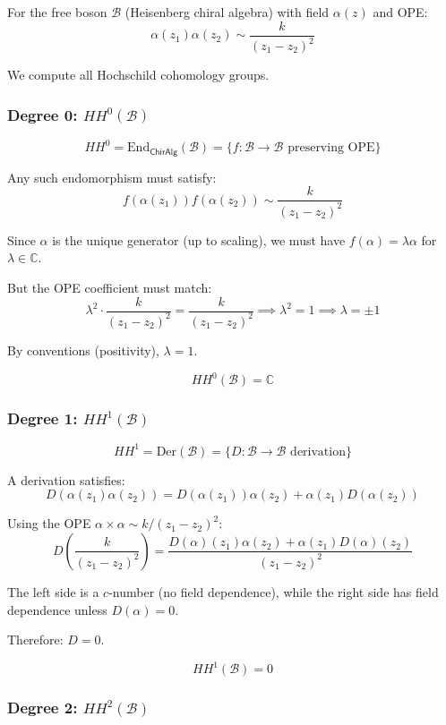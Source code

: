 \begin{example}\label{ex:HH-heisenberg-complete}
For the free boson $\mathcal{B}$ (Heisenberg chiral algebra) with field $\alpha(z)$ and OPE:
$$\alpha(z_1)\alpha(z_2) \sim \frac{k}{(z_1 - z_2)^2}$$

We compute all Hochschild cohomology groups.

\subsubsection{Degree 0: $HH^0(\mathcal{B})$}

$$HH^0 = \text{End}_{\mathsf{ChirAlg}}(\mathcal{B}) = \{f: \mathcal{B} \to \mathcal{B} 
\text{ preserving OPE}\}$$

Any such endomorphism must satisfy:
$$f(\alpha(z_1))f(\alpha(z_2)) \sim \frac{k}{(z_1-z_2)^2}$$

Since $\alpha$ is the unique generator (up to scaling), we must have $f(\alpha) = \lambda \alpha$
for $\lambda \in \mathbb{C}$.

But the OPE coefficient must match:
$$\lambda^2 \cdot \frac{k}{(z_1-z_2)^2} = \frac{k}{(z_1-z_2)^2} \implies \lambda^2 = 1 \implies \lambda = \pm 1$$

By conventions (positivity), $\lambda = 1$.

$$\boxed{HH^0(\mathcal{B}) = \mathbb{C}}$$

\subsubsection{Degree 1: $HH^1(\mathcal{B})$}

$$HH^1 = \text{Der}(\mathcal{B}) = \{D: \mathcal{B} \to \mathcal{B} \text{ derivation}\}$$

A derivation satisfies:
$$D(\alpha(z_1)\alpha(z_2)) = D(\alpha(z_1))\alpha(z_2) + \alpha(z_1)D(\alpha(z_2))$$

Using the OPE $\alpha \times \alpha \sim k/(z_1-z_2)^2$:
$$D\left(\frac{k}{(z_1-z_2)^2}\right) = \frac{D(\alpha)(z_1) \alpha(z_2) + \alpha(z_1)D(\alpha)(z_2)}{(z_1-z_2)^2}$$

The left side is a $c$-number (no field dependence), while the right side has field
dependence unless $D(\alpha) = 0$.

Therefore: $D = 0$.

$$\boxed{HH^1(\mathcal{B}) = 0}$$

\subsubsection{Degree 2: $HH^2(\mathcal{B})$}


\end{example}
